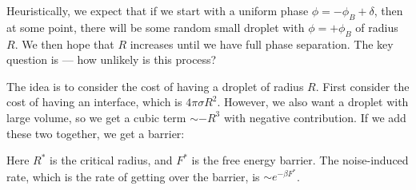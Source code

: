 \documentclass[a4paper]{article}
\begin{document}
Heuristically, we expect that if we start with a uniform phase $\phi = -\phi_B + \delta$, then at some point, there will be some random small droplet with $\phi = +\phi_B$ of radius $R$. We then hope that $R$ increases until we have full phase separation. The key question is --- how unlikely is this process?
\begin{center}
\end{center}
The idea is to consider the cost of having a droplet of radius $R$. First consider the cost of having an interface, which is $4 \pi \sigma R^2$. However, we also want a droplet with large volume, so we get a cubic term $\sim -R^3$ with negative contribution. If we add these two together, we get a barrier:
\begin{center}
\end{center}
Here $R^*$ is the critical radius, and $F^*$ is the free energy barrier. The noise-induced rate, which is the rate of getting over the barrier, is $\sim e^{-\beta F^*}$.
\end{document}
